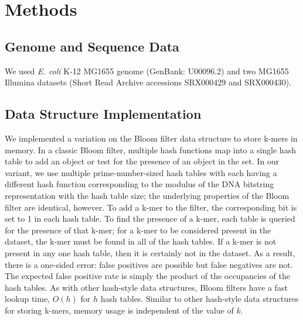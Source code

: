 \documentclass[12pt]{article} \usepackage{simplemargins}
\begin{document}
\section{Methods}

\subsection{Genome and Sequence Data}
We used \emph{E. coli} K-12 MG1655 genome (GenBank: U00096.2) and two MG1655 Illumina 
datasets (Short Read Archive accessions SRX000429 and SRX000430). 

\subsection{Data Structure Implementation}
We implemented a variation on the Bloom filter data structure to store
k-mers in memory. In a classic Bloom filter, multiple hash functions
map into a single hash table to add an object or test for the presence
of an object in the set. In our variant, we use multiple
prime-number-sized hash tables with each having a different hash
function corresponding to the modulus of the DNA bitstring
representation with the hash table size; the underlying properties of
the Bloom filter are identical, however.  To add a k-mer to the
filter, the corresponding bit is set to 1 in each hash table.  To find
the presence of a k-mer, each table is queried for the presence of
that k-mer; for a k-mer to be considered present in the dataset, the
k-mer must be found in all of the hash tables.  If a k-mer is not
present in any one hash table, then it is certainly not in the
dataset. As a result, there is a one-sided error: false positives are
possible but false negatives are not. The expected false positive rate
is simply the product of the occupancies of the hash tables.  As with
other hash-style data structures, Bloom filters have a fast lookup
time, $O(h)$ for $h$ hash tables.  Similar to other hash-style data
structures for storing k-mers, memory usage is independent of the
value of $k$.
\end{document}
